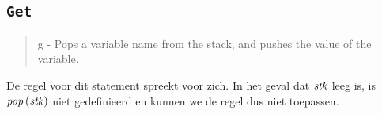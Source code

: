 \subsection{\texttt{Get}}
\label{sec:rules:get}

\begin{quote}
	g - Pops a variable name from the stack, and pushes the value of the
	variable.
\end{quote}

De regel voor dit statement spreekt voor zich. In het geval dat $\mathit{stk}$ leeg is,
is $\mathit{pop}\left(\mathit{stk}\right)$ niet gedefinieerd en kunnen we de regel dus niet toepassen.
\thergetns%
